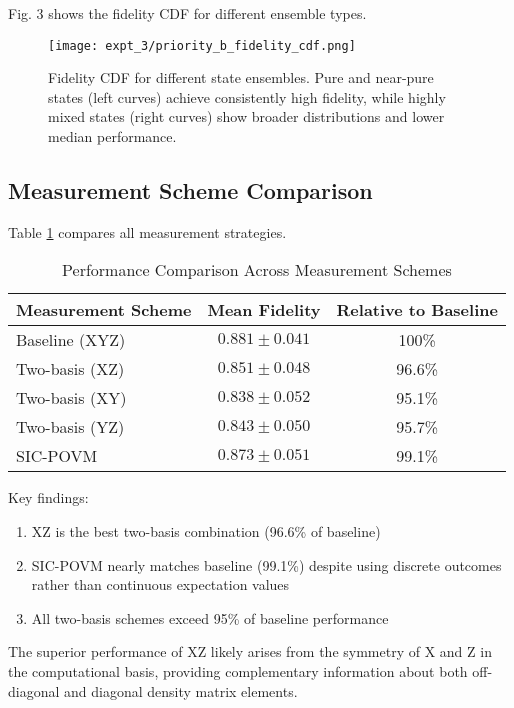 \documentclass[conference]{IEEEtran}
\begin{document}
Fig. 3 shows the fidelity CDF for different ensemble types.

\begin{figure}[t]
\centering
\texttt{[image: expt\_3/priority\_b\_fidelity\_cdf.png]}
\caption{Fidelity CDF for different state ensembles. Pure and near-pure states (left curves) achieve consistently high fidelity, while highly mixed states (right curves) show broader distributions and lower median performance.}
\label{fig:priority_b_cdf}
\end{figure}

\subsection{Measurement Scheme Comparison}

Table \ref{tab:measurement_schemes} compares all measurement strategies.

\begin{table}[t]
\centering
\caption{Performance Comparison Across Measurement Schemes}
\label{tab:measurement_schemes}
\begin{tabular}{lcc}
\toprule
\textbf{Measurement Scheme} & \textbf{Mean Fidelity} & \textbf{Relative to Baseline} \\
\midrule
Baseline (XYZ) & $0.881 \pm 0.041$ & 100\% \\
Two-basis (XZ) & $0.851 \pm 0.048$ & 96.6\% \\
Two-basis (XY) & $0.838 \pm 0.052$ & 95.1\% \\
Two-basis (YZ) & $0.843 \pm 0.050$ & 95.7\% \\
SIC-POVM & $0.873 \pm 0.051$ & 99.1\% \\
\bottomrule
\end{tabular}
\end{table}

Key findings:
\begin{enumerate}
    \item XZ is the best two-basis combination (96.6\% of baseline)
    \item SIC-POVM nearly matches baseline (99.1\%) despite using discrete outcomes rather than continuous expectation values
    \item All two-basis schemes exceed 95\% of baseline performance
\end{enumerate}

The superior performance of XZ likely arises from the symmetry of X and Z in the computational basis, providing complementary information about both off-diagonal and diagonal density matrix elements.
\end{document}

